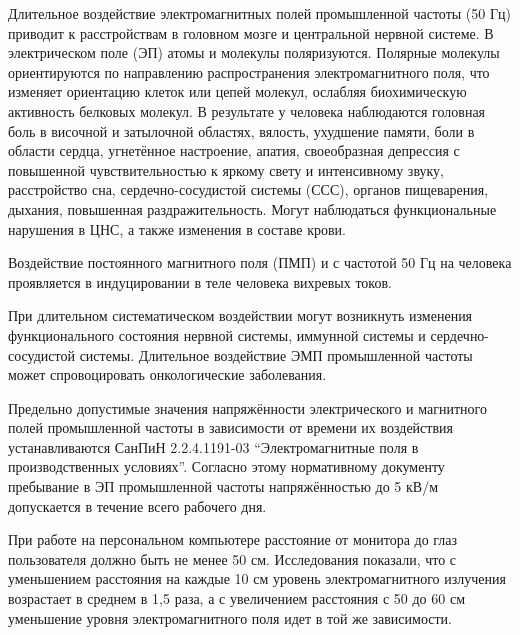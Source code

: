 Длительное воздействие электромагнитных полей промышленной частоты (50 Гц) приводит к расстройствам в головном мозге и центральной нервной системе. В электрическом поле (ЭП) атомы и молекулы поляризуются.
Полярные молекулы ориентируются по направлению распространения электромагнитного поля, что изменяет ориентацию клеток или цепей молекул, ослабляя биохимическую активность белковых молекул.
В результате у человека наблюдаются головная боль в височной и затылочной областях, вялость, ухудшение памяти, боли в области сердца, угнетённое настроение, апатия, своеобразная депрессия с повышенной чувствительностью к яркому свету и интенсивному звуку, расстройство сна, сердечно-сосудистой системы (ССС), органов пищеварения, дыхания, повышенная раздражительность.
Могут наблюдаться функциональные нарушения в ЦНС, а также изменения в составе крови.

Воздействие постоянного магнитного поля (ПМП) и с частотой 50 Гц на человека проявляется в индуцировании в теле человека вихревых токов.

При длительном систематическом воздействии могут возникнуть изменения функционального состояния нервной системы, иммунной системы и сердечно-сосудистой системы. Длительное воздействие ЭМП промышленной частоты может спровоцировать онкологические заболевания.

Предельно допустимые значения напряжённости электрического и магнитного полей промышленной частоты в зависимости от времени их воздействия устанавливаются СанПиН 2.2.4.1191-03 ``Электромагнитные поля в производственных условиях''\cite{OT12}. Согласно этому нормативному документу пребывание в ЭП промышленной частоты напряжённостью до 5 кВ/м допускается в течение всего рабочего дня.

При работе на персональном компьютере расстояние от монитора до глаз пользователя должно быть не менее 50 см. Исследования показали, что с уменьшением расстояния на каждые 10 см уровень электромагнитного излучения возрастает в среднем в 1,5 раза, а с увеличением расстояния с 50 до 60 см уменьшение уровня электромагнитного поля идет в той же зависимости.

